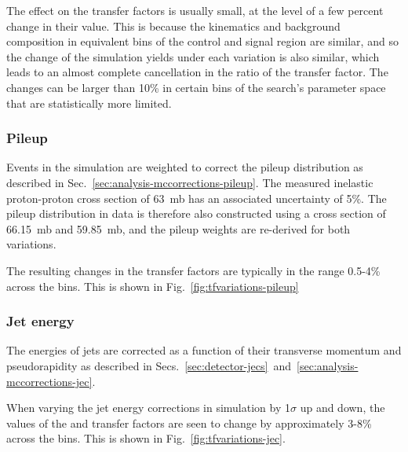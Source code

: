The effect on the transfer factors is usually small, at the level of a few 
percent change in their value. This is because the kinematics and background 
composition in equivalent bins of the control and signal region are similar, 
and so the change of the simulation yields under each variation is also 
similar, which leads to an almost complete cancellation in the ratio of the 
transfer factor. The changes can be larger than 10\% in certain bins of the 
search's parameter space that are statistically more limited.


\subsubsection{Pileup}
Events in the simulation are weighted to correct the pileup distribution as 
described in Sec.~\ref{sec:analysis-mccorrections-pileup}. The measured 
inelastic proton-proton cross section of 63~mb has an associated uncertainty of 
5\%. The pileup distribution in data is therefore also constructed using a 
cross section of 66.15~mb and 59.85~mb, and the pileup weights are re-derived 
for both variations.

The resulting changes in the transfer factors are typically in the range 
0.5-4\% across the \njnbht bins. This is shown in 
Fig.~\ref{fig:tfvariations-pileup}

\subsubsection{Jet energy}
The energies of jets are corrected as a function of their transverse momentum 
and pseudorapidity as described in 
Secs.~\ref{sec:detector-jecs}~and~\ref{sec:analysis-mccorrections-jec}. 

When varying the jet energy corrections in simulation by 1$\sigma$ up and down, 
the values of the \Tmutottw and \Tmumutoz transfer factors are seen to change 
by approximately 3-8\% across the \njnbht bins.
This is shown in Fig.~\ref{fig:tfvariations-jec}.


